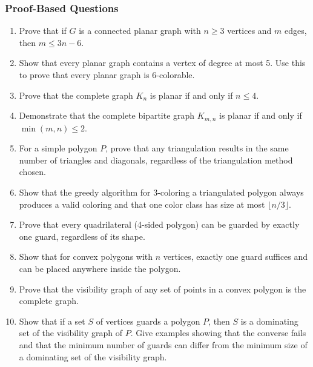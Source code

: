 \documentclass{article}
\theoremstyle{definition}
\begin{document}
\subsubsection{Proof-Based Questions}
\begin{enumerate}[start=41]
\item Prove that if $G$ is a connected planar graph with $n \geq 3$ vertices and $m$ edges, then $m \leq 3n - 6$.

\item Show that every planar graph contains a vertex of degree at most 5. Use this to prove that every planar graph is 6-colorable.

\item Prove that the complete graph $K_n$ is planar if and only if $n \leq 4$.

\item Demonstrate that the complete bipartite graph $K_{m,n}$ is planar if and only if $\min(m,n) \leq 2$.

\item For a simple polygon $P$, prove that any triangulation results in the same number of triangles and diagonals, regardless of the triangulation method chosen.

\item Show that the greedy algorithm for 3-coloring a triangulated polygon always produces a valid coloring and that one color class has size at most $\lfloor n/3 \rfloor$.

\item Prove that every quadrilateral (4-sided polygon) can be guarded by exactly one guard, regardless of its shape.

\item Show that for convex polygons with $n$ vertices, exactly one guard suffices and can be placed anywhere inside the polygon.

\item Prove that the visibility graph of any set of points in a convex polygon is the complete graph.

\item Show that if a set $S$ of vertices guards a polygon $P$, then $S$ is a dominating set of the visibility graph of $P$. Give examples showing that the converse fails and that the minimum number of guards can differ from the minimum size of a dominating set of the visibility graph.
\end{enumerate}
\end{document}
